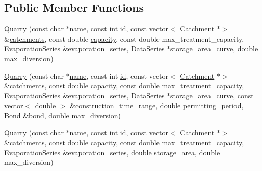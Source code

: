 \subsection*{Public Member Functions}
\begin{DoxyCompactItemize}
\item 
\mbox{\hyperlink{classQuarry_a126fddda9e5deeb667a6a9dbb0533470}{Quarry}} (const char $\ast$\mbox{\hyperlink{classWaterSource_a846ea74c5b453d014f594d41fee8c765}{name}}, const int \mbox{\hyperlink{classWaterSource_a6eafe5dfefd317877d1244e8a7c6e742}{id}}, const vector$<$ \mbox{\hyperlink{classCatchment}{Catchment}} $\ast$$>$ \&\mbox{\hyperlink{classWaterSource_a8c18c34f23f8a06685c1d12f462ed830}{catchments}}, const double \mbox{\hyperlink{classWaterSource_a2ec257b415b248214a8bce7fc5267723}{capacity}}, const double max\+\_\+treatment\+\_\+capacity, \mbox{\hyperlink{classEvaporationSeries}{Evaporation\+Series}} \&\mbox{\hyperlink{classReservoir_a2d2d9b302c13703309bb798d24136810}{evaporation\+\_\+series}}, \mbox{\hyperlink{classDataSeries}{Data\+Series}} $\ast$\mbox{\hyperlink{classReservoir_a46bd5b750963dfa9a57b247fd77ab8ff}{storage\+\_\+area\+\_\+curve}}, double max\+\_\+diversion)
\item 
\mbox{\hyperlink{classQuarry_a13cc1caeda6846900893f8d24c49b111}{Quarry}} (const char $\ast$\mbox{\hyperlink{classWaterSource_a846ea74c5b453d014f594d41fee8c765}{name}}, const int \mbox{\hyperlink{classWaterSource_a6eafe5dfefd317877d1244e8a7c6e742}{id}}, const vector$<$ \mbox{\hyperlink{classCatchment}{Catchment}} $\ast$$>$ \&\mbox{\hyperlink{classWaterSource_a8c18c34f23f8a06685c1d12f462ed830}{catchments}}, const double \mbox{\hyperlink{classWaterSource_a2ec257b415b248214a8bce7fc5267723}{capacity}}, const double max\+\_\+treatment\+\_\+capacity, \mbox{\hyperlink{classEvaporationSeries}{Evaporation\+Series}} \&\mbox{\hyperlink{classReservoir_a2d2d9b302c13703309bb798d24136810}{evaporation\+\_\+series}}, \mbox{\hyperlink{classDataSeries}{Data\+Series}} $\ast$\mbox{\hyperlink{classReservoir_a46bd5b750963dfa9a57b247fd77ab8ff}{storage\+\_\+area\+\_\+curve}}, const vector$<$ double $>$ \&construction\+\_\+time\+\_\+range, double permitting\+\_\+period, \mbox{\hyperlink{classBond}{Bond}} \&bond, double max\+\_\+diversion)
\item 
\mbox{\hyperlink{classQuarry_a28c4db26230c2ff3f82c8c0f70f2f124}{Quarry}} (const char $\ast$\mbox{\hyperlink{classWaterSource_a846ea74c5b453d014f594d41fee8c765}{name}}, const int \mbox{\hyperlink{classWaterSource_a6eafe5dfefd317877d1244e8a7c6e742}{id}}, const vector$<$ \mbox{\hyperlink{classCatchment}{Catchment}} $\ast$$>$ \&\mbox{\hyperlink{classWaterSource_a8c18c34f23f8a06685c1d12f462ed830}{catchments}}, const double \mbox{\hyperlink{classWaterSource_a2ec257b415b248214a8bce7fc5267723}{capacity}}, const double max\+\_\+treatment\+\_\+capacity, \mbox{\hyperlink{classEvaporationSeries}{Evaporation\+Series}} \&\mbox{\hyperlink{classReservoir_a2d2d9b302c13703309bb798d24136810}{evaporation\+\_\+series}}, double storage\+\_\+area, double max\+\_\+diversion)
$$
\end{DoxyCompactItemize}
